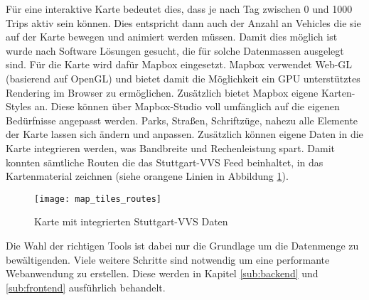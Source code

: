    Für eine interaktive Karte bedeutet dies, dass je nach Tag zwischen 0 und 1000 Trips aktiv sein können. Dies entspricht dann auch der Anzahl an Vehicles die sie auf der Karte bewegen und animiert werden müssen. Damit dies möglich ist wurde nach Software Lösungen gesucht, die für solche Datenmassen ausgelegt sind. Für die Karte wird dafür Mapbox eingesetzt. Mapbox verwendet Web-GL (basierend auf OpenGL) und bietet damit die Möglichkeit ein GPU unterstütztes Rendering im Browser zu ermöglichen. Zusätzlich bietet Mapbox eigene Karten-Styles an. Diese können über Mapbox-Studio voll umfänglich auf die eigenen Bedürfnisse angepasst werden. Parks, Straßen, Schriftzüge, nahezu alle Elemente der Karte lassen sich ändern und anpassen. Zusätzlich können eigene Daten in die Karte integrieren werden, was Bandbreite und Rechenleistung spart. Damit konnten sämtliche Routen die das Stuttgart-VVS Feed beinhaltet, in das Kartenmaterial zeichnen (siehe orangene Linien in Abbildung \ref{fig:map_tiles_routes}).\\

    \begin{figure}[htbp]
      \begin{center}
        \texttt{[image: map\_tiles\_routes]}
        \caption{Karte mit integrierten Stuttgart-VVS Daten}
        \label{fig:map_tiles_routes}
      \end{center}
    \end{figure}
    
    Die Wahl der richtigen Tools ist dabei nur die Grundlage um die Datenmenge zu bewältigenden. Viele weitere Schritte sind notwendig um eine performante Webanwendung zu erstellen. Diese werden in Kapitel \ref{sub:backend} \nameref{} und \ref{sub:frontend}  ausführlich behandelt.
      
